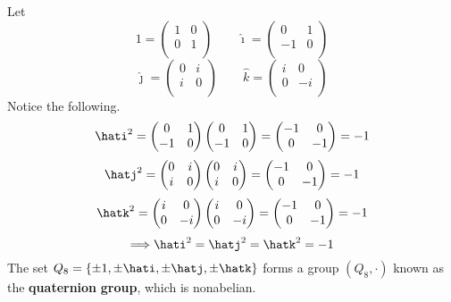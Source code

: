 \documentclass[12pt, letterpaper]{report}
\begin{document}
\begin{eg}
	Let
	\[
		1=\begin{pmatrix}
			1 &0   \\
			 0&  1 \\
		\end{pmatrix}\qquad \hat{\imath}=\begin{pmatrix}
			 0&1   \\
			 -1&  0 \\
		\end{pmatrix}
	\]
	\[
		\hat{\jmath}=\begin{pmatrix}
			0 &i   \\
			 i&  0 \\
		\end{pmatrix}\qquad \hat{k}=\begin{pmatrix}
			i &0   \\
			 0&  -i \\
		\end{pmatrix}
	\]
	Notice the following. 
	\[
		\hati^2=\begin{pmatrix}
			0 &1   \\
			 -1&  0 \\
		\end{pmatrix}\begin{pmatrix}
			0 &1   \\
			 -1&  0 \\
		\end{pmatrix}=\begin{pmatrix}
			-1 &0   \\
			 0&-1   \\
		\end{pmatrix}=-1
	\]
	\[
		\hatj^2=\begin{pmatrix}
			0 &i   \\
			 i&  0 \\
		\end{pmatrix}\begin{pmatrix}
			0 &i   \\
			 i&  0 \\
		\end{pmatrix}=\begin{pmatrix}
			-1 &0   \\
			 0&-1   \\
		\end{pmatrix}=-1
	\]
	\[
		\hatk^2=\begin{pmatrix}
			i &0   \\
			 0&  -i \\
		\end{pmatrix}\begin{pmatrix}
		i &0   \\
		 0&  -i \\
	\end{pmatrix}=\begin{pmatrix}
		-1 &0   \\
		 0&-1   \\
	\end{pmatrix}=-1
	\]
	\[
		\Longrightarrow \hati^2 =\hatj^2 =\hatk^2=-1
	\]
	The set \(Q_8 =\{ \pm1,\pm\hati,\pm\hatj,\pm\hatk \} \) forms a group \(\left( Q_8,\cdot \right) \) known as the \textbf{quaternion} \textbf{group}, which is nonabelian.
\end{eg}
\end{document}
